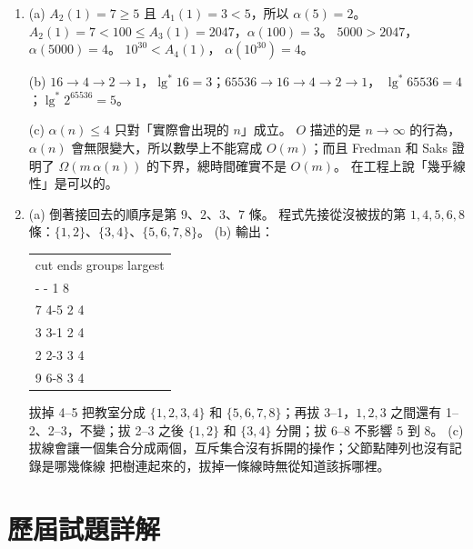 \begin{enumerate}
假設 $z$ 同時在 $N(x)$ 和 $N(y)$ 裡，$x \ne y$，而且 $x$ 比 $y$ 先變成秩 $r$。 集合只會
合併、不會拆開，所以 $x$ 變成秩 $r$ 之後，$z$ 和 $x$ 一直在同一棵樹裡。 到了 $y$ 變成秩
$r$ 的那一刻，$z$ 在 $y$ 的樹裡，所以 $x$ 也在 $y$ 的樹裡，而 $y$ 是根、$x \ne y$，$x$
是 $y$ 的子孫。 由引理~\ref{lem:ds-rank} (1)，沿著 $x$ 到 $y$ 的路徑秩嚴格變大，
$\mathit{rank}[x] < \mathit{rank}[y] = r$；但秩不會變小，$\mathit{rank}[x] \ge r$，矛盾。
所以秩 $r$ 的節點最多 $n / 2^r$ 個。 （這也再一次說明秩不超過 $\lg n$。）

\item (a) $A_2(1) = 7 \ge 5$ 且 $A_1(1) = 3 < 5$，所以 $\alpha(5) = 2$。 $A_2(1) = 7 < 100 \le
A_3(1) = 2047$，$\alpha(100) = 3$。 $5000 > 2047$，$\alpha(5000) = 4$。 $10^{30} < A_4(1)$，
$\alpha(10^{30}) = 4$。

(b) $16 \to 4 \to 2 \to 1$，$\lg^* 16 = 3$；$65536 \to 16 \to 4 \to 2 \to 1$，
$\lg^* 65536 = 4$；$\lg^* 2^{65536} = 5$。

(c) $\alpha(n) \le 4$ 只對「實際會出現的 $n$」成立。 $O$ 描述的是 $n \to \infty$ 的行為，
$\alpha(n)$ 會無限變大，所以數學上不能寫成 $O(m)$；而且 Fredman 和 Saks 證明了
$\Omega(m\,\alpha(n))$ 的下界，總時間確實不是 $O(m)$。 在工程上說「幾乎線性」是可以的。

\item (a) 倒著接回去的順序是第 $9$、$2$、$3$、$7$ 條。 程式先接從沒被拔的第 $1, 4, 5,
6, 8$ 條：$\{1, 2\}$、$\{3, 4\}$、$\{5, 6, 7, 8\}$。
(b) 輸出：
\begin{center}
\ttfamily
\begin{tabular}{l}
cut ends groups largest \\
- - 1 8 \\
7 4-5 2 4 \\
3 3-1 2 4 \\
2 2-3 3 4 \\
9 6-8 3 4 \\
\end{tabular}
\end{center}
拔掉 4--5 把教室分成 $\{1, 2, 3, 4\}$ 和 $\{5, 6, 7, 8\}$；再拔 3--1，$1, 2, 3$ 之間還有
1--2、2--3，不變；拔 2--3 之後 $\{1, 2\}$ 和 $\{3, 4\}$ 分開；拔 6--8 不影響 $5$ 到 $8$。
(c) 拔線會讓一個集合分成兩個，互斥集合沒有拆開的操作；父節點陣列也沒有記錄是哪幾條線
把樹連起來的，拔掉一條線時無從知道該拆哪裡。
\end{enumerate}

\section*{歷屆試題詳解}

